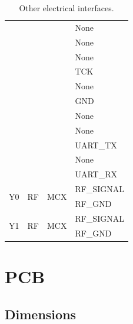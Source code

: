 \begin{table}[!htb]
\begin{tabular}{lccl}
                              &                        &                              & None \\
                              &                        &                              & None \\
                              &                        &                              & None \\
                              &                        &                              & TCK \\
                              &                        &                              & None \\
                              &                        &                              & GND \\
                              &                        &                              & None \\
                              &                        &                              & None \\
                              &                        &                              & UART\_TX \\
                              &                        &                              & None \\
                              &                        &                              & UART\_RX \\
        \midrule
        \multirow{2}{*}{Y0} & \multirow{2}{*}{RF} & \multirow{2}{*}{MCX} & RF\_SIGNAL \\
                            &                     &                      & RF\_GND \\
        \midrule
        \multirow{2}{*}{Y1} & \multirow{2}{*}{RF} & \multirow{2}{*}{MCX} & RF\_SIGNAL \\
                            &                     &                      & RF\_GND \\
        \bottomrule[1.5pt]
    \end{tabular}
    \caption{Other electrical interfaces.}
    \label{tab:other-elect_interf}
\end{table}

\section{PCB}

\subsection{Dimensions}

